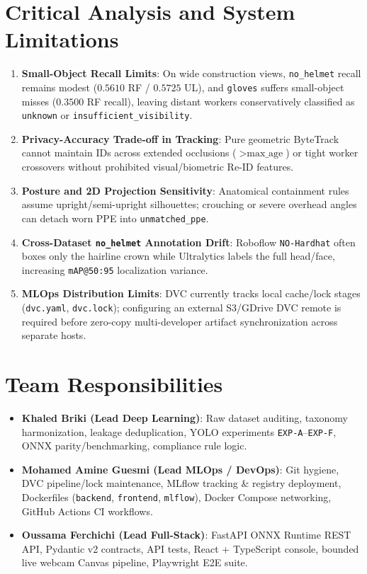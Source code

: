 \documentclass[11pt,a4paper]{article}
\begin{document}
\section{Critical Analysis and System Limitations}
\begin{enumerate}
  \item \textbf{Small-Object Recall Limits}: On wide construction views, \texttt{no\_helmet} recall remains modest ($0.5610$ RF / $0.5725$ UL), and \texttt{gloves} suffers small-object misses ($0.3500$ RF recall), leaving distant workers conservatively classified as \texttt{unknown} or \texttt{insufficient\_visibility}.
  \item \textbf{Privacy-Accuracy Trade-off in Tracking}: Pure geometric ByteTrack cannot maintain IDs across extended occlusions ($> \text{max\_age}$) or tight worker crossovers without prohibited visual/biometric Re-ID features.
  \item \textbf{Posture and 2D Projection Sensitivity}: Anatomical containment rules assume upright/semi-upright silhouettes; crouching or severe overhead angles can detach worn PPE into \texttt{unmatched\_ppe}.
  \item \textbf{Cross-Dataset \texttt{no\_helmet} Annotation Drift}: Roboflow \texttt{NO-Hardhat} often boxes only the hairline crown while Ultralytics labels the full head/face, increasing \texttt{mAP@50:95} localization variance.
  \item \textbf{MLOps Distribution Limits}: DVC currently tracks local cache/lock stages (\texttt{dvc.yaml}, \texttt{dvc.lock}); configuring an external S3/GDrive DVC remote is required before zero-copy multi-developer artifact synchronization across separate hosts.
\end{enumerate}

\section{Team Responsibilities}
\begin{itemize}
  \item \textbf{Khaled Briki (Lead Deep Learning)}: Raw dataset auditing, taxonomy harmonization, leakage deduplication, YOLO experiments \texttt{EXP-A}--\texttt{EXP-F}, ONNX parity/benchmarking, compliance rule logic.
  \item \textbf{Mohamed Amine Guesmi (Lead MLOps / DevOps)}: Git hygiene, DVC pipeline/lock maintenance, MLflow tracking \& registry deployment, Dockerfiles (\texttt{backend}, \texttt{frontend}, \texttt{mlflow}), Docker Compose networking, GitHub Actions CI workflows.
  \item \textbf{Oussama Ferchichi (Lead Full-Stack)}: FastAPI ONNX Runtime REST API, Pydantic v2 contracts, API tests, React + TypeScript console, bounded live webcam Canvas pipeline, Playwright E2E suite.
\end{itemize}
\end{document}
